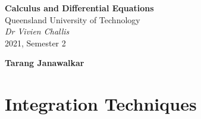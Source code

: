 \documentclass{article}
\date{}
\newcommand{\uniTitle}{Queensland University of Technology}
\newcommand{\className}{Calculus and Differential Equations}
\newcommand{\classTime}{2021, Semester 2}
\newcommand{\classInstructorName}{Dr Vivien Challis}
\newcommand{\authorName}{Tarang Janawalkar}
\begin{document}
\begin{titlepage}
    \vspace*{\fill}
    \begin{center}
        \LARGE
        \textbf{\className}
        \texorpdfstring{\\}{ }
        \uniTitle
        \texorpdfstring{\\}{ }
        \texorpdfstring{\vspace{0.3in}}{ }
        \normalsize\textit{\classInstructorName}
        \texorpdfstring{\\}{ }
        \classTime
    \end{center}
    \begin{center}
        \textbf{\authorName}
    \end{center}
    \vspace*{\fill}
    \doclicenseThis
    \thispagestyle{empty}
\end{titlepage}
\newpage

\tableofcontents
\newpage

\section{Integration Techniques}
\end{document}

